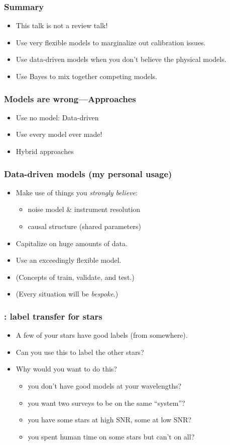 \documentclass[pdftex]{beamer}
\newcommand{\conclusions}{%
\begin{frame}
  \frametitle{Summary}
  \begin{itemize}
  \item This talk is not a review talk!
  \item Use very flexible models to marginalize out calibration issues.
  \item Use data-driven models when you don't believe the physical models.
  \item Use Bayes to mix together competing models.
  \end{itemize}
\end{frame}}
\begin{document}
\conclusions

\begin{frame}
  \frametitle{Models are wrong---Approaches}
  \begin{itemize}
  \item Use no model: Data-driven
  \item Use every model ever made!
  \item Hybrid approaches
  \end{itemize}
\end{frame}

\begin{frame}
  \frametitle{Data-driven models (my personal usage)}
  \begin{itemize}
  \item Make use of things you \emph{strongly believe}:
    \begin{itemize}
    \item noise model \& instrument resolution
    \item causal structure (shared parameters)
    \end{itemize}
  \item Capitalize on huge amounts of data.
  \item Use an exceedingly flexible model.
  \item (Concepts of train, validate, and test.)
  \item (Every situation will be \emph{bespoke}.)
  \end{itemize}
\end{frame}

\begin{frame}
  \frametitle{\tc: label transfer for stars}
  \begin{itemize}
  \item A few of your stars have good labels (from somewhere).
  \item Can you use this to label the other stars?
  \item Why would you want to do this?
    \begin{itemize}
    \item<2> you don't have good models at your wavelengths?
    \item<2> you want two surveys to be on the same ``system''?
    \item<2> you have some stars at high SNR, some at low SNR?
    \item<2> you spent human time on some stars but can't on all?
    \end{itemize}
  \end{itemize}
\end{frame}
\end{document}
